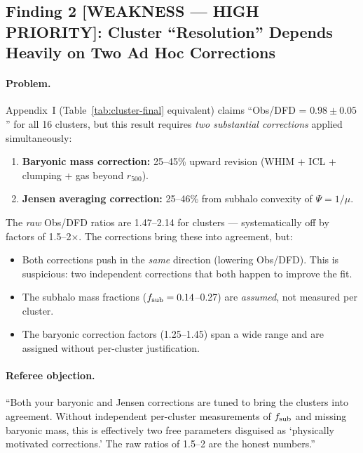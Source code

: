 \subsection*{Finding 2 [WEAKNESS --- HIGH PRIORITY]:
Cluster ``Resolution'' Depends Heavily on Two Ad Hoc Corrections}

\paragraph{Problem.}
Appendix~I (Table~\ref{tab:cluster-final} equivalent) claims
``Obs/DFD = $0.98 \pm 0.05$'' for all 16 clusters, but this result
requires \emph{two substantial corrections} applied simultaneously:

\begin{enumerate}
\item \textbf{Baryonic mass correction:} 25--45\% upward revision
  (WHIM + ICL + clumping + gas beyond $r_{500}$).
\item \textbf{Jensen averaging correction:} 25--46\% from subhalo
  convexity of $\Psi = 1/\mu$.
\end{enumerate}

The \emph{raw} Obs/DFD ratios are 1.47--2.14 for clusters ---
systematically off by factors of 1.5--2$\times$.  The corrections bring
these into agreement, but:

\begin{itemize}
\item Both corrections push in the \emph{same} direction (lowering
  Obs/DFD).  This is suspicious: two independent corrections that
  both happen to improve the fit.
\item The subhalo mass fractions ($f_{\rm sub} = 0.14$--0.27) are
  \emph{assumed}, not measured per cluster.
\item The baryonic correction factors (1.25--1.45) span a wide range
  and are assigned without per-cluster justification.
\end{itemize}

\paragraph{Referee objection.}
``Both your baryonic and Jensen corrections are tuned to bring the
clusters into agreement.  Without independent per-cluster measurements
of $f_{\rm sub}$ and missing baryonic mass, this is effectively two
free parameters disguised as `physically motivated corrections.'
The raw ratios of 1.5--2 are the honest numbers.''

